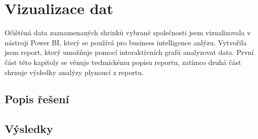 \chapter{Vizualizace dat}
\label{ch:vizualizace}

Očištěná data zaznamenaných shrinků vybrané společnosti jsem vizualizovala v nástroji Power BI, který se používá pro business intelligence anlýzu. Vytvořila jsem report, který umožňuje pomocí interaktivních grafů analyzovat data. První část této kapitoly se věnuje technickému popisu reportu, zatímco druhá část shrnuje výsledky analýzy plynoucí z reportu.

\section{Popis řešení}
\label{sec:vizualizace:popis}




\section{Výsledky}
\label{sec:vizualizace:vysl}
